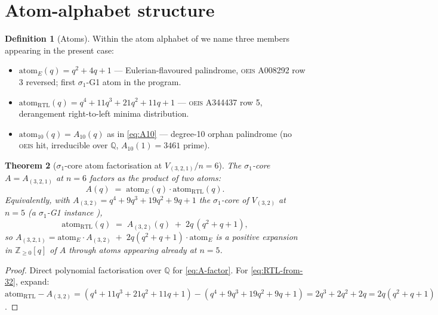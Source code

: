 \documentclass{article}
\newtheorem{theorem}{Theorem}
\theoremstyle{definition}
\newtheorem{definition}[theorem]{Definition}
\begin{document}
\section{Atom-alphabet structure}

\begin{definition}[Atoms]\label{def:atoms}
Within the atom alphabet of \cite{ClioApr27-atomalphabet} we name three members
appearing in the present case:
\begin{itemize}
\item $\mathrm{atom}_E(q)=q^2+4q+1$ — Eulerian-flavoured palindrome, \textsc{oeis} A008292 row 3 reversed; first $\sigma_1$-G1 atom in the program.
\item $\mathrm{atom}_{\mathrm{RTL}}(q)=q^4+11q^3+21q^2+11q+1$ — \textsc{oeis} A344437 row 5, derangement right-to-left minima distribution.
\item $\mathrm{atom}_{10}(q)=A_{10}(q)$ as in \eqref{eq:A10} — degree-10 orphan palindrome (no \textsc{oeis} hit, irreducible over $\mathbb{Q}$, $A_{10}(1)=3461$ prime).
\end{itemize}
\end{definition}

\begin{theorem}[$\sigma_1$-core atom factorisation at $V_{(3,2,1)}/n=6$]\label{thm:sigma1-321}
The $\sigma_1$-core $A=A_{(3,2,1)}$ at $n=6$ factors as the product of two atoms:
\begin{equation}
A(q)\;=\;\mathrm{atom}_E(q)\cdot\mathrm{atom}_{\mathrm{RTL}}(q).
\label{eq:A-factor}
\end{equation}
Equivalently, with $A_{(3,2)}=q^4+9q^3+19q^2+9q+1$ the $\sigma_1$-core of
$V_{(3,2)}$ at $n=5$ (a $\sigma_1$-G1 instance \cite{ClioApr24-sigma1G1}),
\begin{equation}
\mathrm{atom}_{\mathrm{RTL}}(q)\;=\;A_{(3,2)}(q)\;+\;2q\,(q^2+q+1),
\label{eq:RTL-from-32}
\end{equation}
so $A_{(3,2,1)}=\mathrm{atom}_E\cdot A_{(3,2)} \;+\; 2q(q^2+q+1)\cdot \mathrm{atom}_E$
is a positive expansion in $\mathbb{Z}_{\geq 0}[q]$ of $A$ through atoms appearing
already at $n=5$.
\end{theorem}

\begin{proof}
Direct polynomial factorisation over $\mathbb{Q}$ for \eqref{eq:A-factor}.
For \eqref{eq:RTL-from-32}, expand: $\mathrm{atom}_{\mathrm{RTL}}-A_{(3,2)} =
(q^4+11q^3+21q^2+11q+1)-(q^4+9q^3+19q^2+9q+1) = 2q^3+2q^2+2q = 2q(q^2+q+1)$.
\end{proof}
\end{document}
